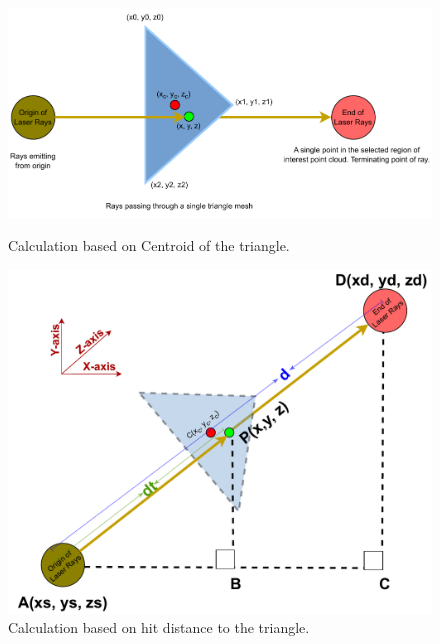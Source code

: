 \begin{figure}[htbp]
    \centering
    \begin{minipage}[b]{0.47\textwidth}
    \centering
    \includegraphics[width=1\linewidth]{97_graphics/concepts/raycasting_single_triangle_by_centroid.pdf}
    \caption{Calculation based on Centroid of the triangle.}
    \label{fig:concept-raycasting_single_triangle_by_centroid}
    \end{minipage}
    \hfill
    \begin{minipage}[b]{0.47\textwidth}
    \centering
    \includegraphics[width=1\linewidth]{97_graphics/concepts/raycasting_single_triangle_by_t_hit.pdf}
    \caption{Calculation based on hit distance to the triangle.}
    \label{fig:concept-raycasting_single_triangle_by_t_hit}
    \end{minipage}
\end{figure}

